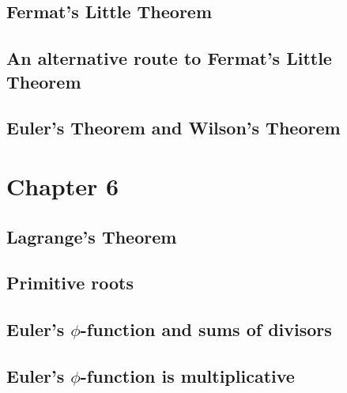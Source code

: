 \documentclass{article}
\numberwithin{equation}{thm}
\begin{document}



\subsection*{Fermat's Little Theorem}




\subsection*{An alternative route to Fermat's Little Theorem}




\subsection*{Euler's Theorem and Wilson's Theorem}





\pagebreak



\setcounter{section}{5}

\section{Chapter 6}


\subsection*{Lagrange's Theorem}




\subsection*{Primitive roots}




\subsection*{Euler's $\phi$-function and sums of divisors}




\subsection*{Euler's $\phi$-function is multiplicative}


\end{document}
